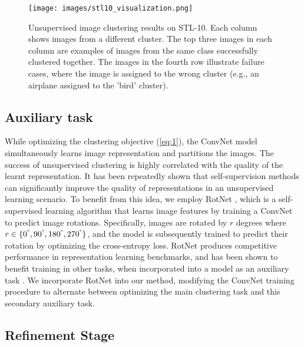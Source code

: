 \documentclass[a4paper,conference]{IEEEtran}
\begin{document}
\begin{figure*}[t]
\begin{center}
   \texttt{[image: images/stl10\_visualization.png]}
   \vspace{-.6in}
\end{center}
   \caption{Unsupervised image clustering results on STL-10. Each column shows images from a different cluster. The top three images in each column are examples of images from the same class successfully clustered together. The images in the fourth row illustrate failure cases, where the image is assigned to the wrong cluster (e.g., an airplane assigned to the 'bird' cluster).}
\label{fig:stl-10}
\end{figure*}

\subsection{Auxiliary task}

While optimizing the clustering objective (\ref{eq:1}), the ConvNet model simultaneously learns image representation and partitions the images. The success of unsupervised clustering is highly correlated with the quality of the learnt representation. It has been repeatedly shown that self-supervision methods can significantly improve the quality of representations in an unsupervised learning scenario. To benefit from this idea, we employ RotNet \cite{gidaris2018unsupervised}, which is a self-supervised learning algorithm that learns image features by training a ConvNet to predict image rotations. Specifically, images are rotated by $r$ degrees where $r\in \{ 0^{\degree}, 90^{\degree}, 180^{\degree}, 270^{\degree}\}$, and the model is subsequently trained to predict their rotation by optimizing the cross-entropy loss. RotNet produces competitive performance in representation learning benchmarks, and has been shown to benefit training in other tasks, when incorporated into a model as an auxiliary task \cite{chen2018ssgan,Gidaris2019BoostingFV,lucic2019fewlabelsgans}. We incorporate RotNet into our method, modifying the ConvNet training procedure to alternate between optimizing the main clustering task and this secondary auxiliary task.

\subsection{Refinement Stage}
\end{document}
